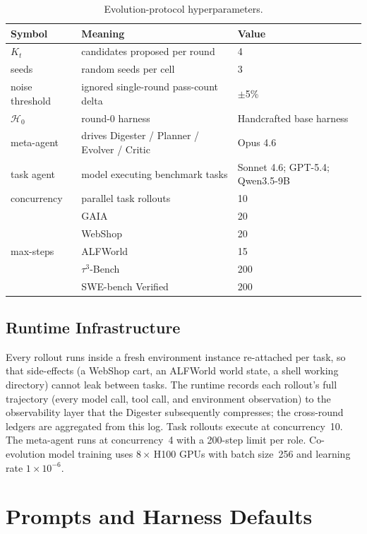 \begin{table}[!htbp]
\centering
\small
\caption{Evolution-protocol hyperparameters.}
\label{tab:hyperparams}
\begin{tabular}{lll}
\toprule
\textbf{Symbol} & \textbf{Meaning} & \textbf{Value} \\
\midrule
$K_t$ & candidates proposed per round & 4 \\
seeds & random seeds per cell & 3 \\
noise threshold & ignored single-round pass-count delta & $\pm$5\% \\
$\mathcal{H}_0$ & round-0 harness & Handcrafted base harness \\
meta-agent & drives Digester / Planner / Evolver / Critic & Opus 4.6 \\
task agent & model executing benchmark tasks & Sonnet 4.6; GPT-5.4; Qwen3.5-9B \\
concurrency & parallel task rollouts & 10 \\
\midrule
\multirow{5}{*}{max-steps}
  & GAIA & 20 \\
  & WebShop & 20 \\
  & ALFWorld & 15 \\
  & $\tau^3$-Bench & 200 \\
  & SWE-bench Verified & 200 \\
\bottomrule
\end{tabular}
\end{table}


\subsection{Runtime Infrastructure}
\label{app:runtime}

Every rollout runs inside a fresh environment instance re-attached per task, so
that side-effects (a WebShop cart, an ALFWorld world state, a shell working
directory) cannot leak between tasks. The runtime records each rollout's full
trajectory (every model call, tool call, and environment observation) to the
observability layer that the Digester subsequently compresses; the
cross-round ledgers are aggregated from this log. Task
rollouts execute at concurrency~10. The meta-agent runs at concurrency~4 with a 200-step limit per role. Co-evolution model training uses $8\times$\,H100 GPUs with batch size~256 and learning rate $1\times10^{-6}$.

\section{Prompts and Harness Defaults}
\label{app:prompts}

